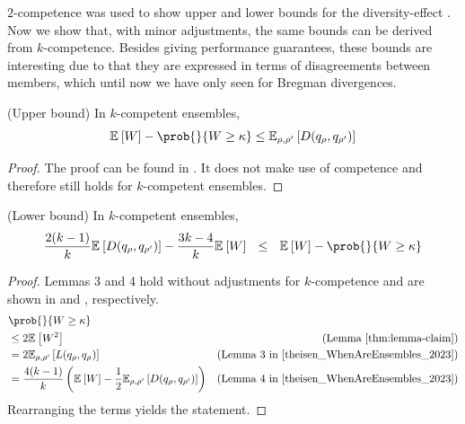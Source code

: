 \documentclass[../main.tex]{subfiles}
\begin{document}
$2$-competence was used to show upper and lower bounds for the diversity-effect \cite{theisen_WhenAreEnsembles_2023}. Now we show that, with minor adjustments, the same bounds can be derived from $k$-competence. 
Besides giving performance guarantees, these bounds are interesting due to that they are expressed in terms of disagreements between members, which until now we have only seen for Bregman divergences.

\begin{theorem} (Upper bound) In $k$-competent ensembles,
$$
\mathbb{E}_{}\left[ W \right] - \prob{}{W \geq \kappa} \leq \mathbb{E}_{\rho, \rho'}\left[ D(q_{\rho}, q_{\rho'}) \right]  
$$
\end{theorem}
\begin{proof}
    The proof can be found in \cite{theisen_WhenAreEnsembles_2023}. It does not make use of competence and therefore still holds for $k$-competent ensembles.
\end{proof}

\begin{theorem} (Lower bound) In $k$-competent ensembles,
$$
 \frac{2(k-1)}{k}\mathbb{E}_{}\left[ D(q_{\rho}, q_{\rho'}) \right]  - \frac{3k-4}{k}\mathbb{E}_{}\left[ W \right] 
 ~ ~ \leq ~ ~
\mathbb{E}_{}\left[ W \right] - \prob{}{W \geq \kappa} 
$$
\end{theorem}
\begin{proof}
Lemmas 3 and 4 hold without adjustments for $k$-competence and are shown in \cite{cited-by-theisen} and \cite{theisen_WhenAreEnsembles_2023}, respectively.
\begin{align*}
& \prob{}{W \geq \kappa}  \\
& \leq  2 \mathbb{E}_{}\left[ W^2 \right]  & \text{(Lemma \ref{thm:lemma-claim})}   \\
& =  2\mathbb{E}_{\rho, \rho'}\left[ L(q_{\rho}, q_{\rho_{}}) \right]  & \text{(Lemma 3 in \cite{theisen_WhenAreEnsembles_2023})} \\
& = \frac{4(k-1)}{k} \left(  \mathbb{E}_{}\left[ W  \right] - \frac{1}{2} \mathbb{E}_{\rho, \rho'}\left[ D(q_{\rho}, q_{\rho'}) \right]    \right) & \text{(Lemma 4 in \cite{theisen_WhenAreEnsembles_2023})} 
\end{align*}
Rearranging the terms yields the statement.
\end{proof}
\end{document}
